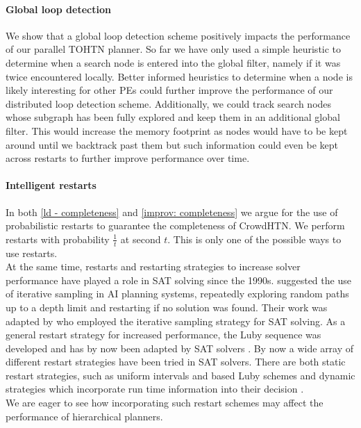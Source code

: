 \paragraph{Global loop detection}
We show that a global loop detection scheme positively impacts the performance of our parallel TOHTN planner. So far we have only used a simple heuristic to determine when a search node is entered into the global filter, namely if it was twice encountered locally.
Better informed heuristics to determine when a node is likely interesting for other PEs could further improve the performance of our distributed loop detection scheme. Additionally, we could track search nodes whose subgraph has been fully explored and keep them in an additional global filter. This would increase the memory footprint as nodes would have to be kept around until we backtrack past them but such information could even be kept across restarts to further improve performance over time.

\paragraph{Intelligent restarts}
In both \ref{ld - completeness} and \ref{improv: completeness} we argue for the use of probabilistic restarts to guarantee the completeness of CrowdHTN. We perform restarts with probability $\frac{1}{t}$ at second $t$. This is only one of the possible ways to use restarts. \\
At the same time, restarts and restarting strategies to increase solver performance have played a role in SAT solving since the 1990s.
\cite{langley1992systematic} suggested the use of iterative sampling in AI planning systems, repeatedly exploring random paths up to a depth limit and restarting if no solution was found. 
Their work was adapted by \cite{crawford1994experimental} who employed the iterative sampling strategy for SAT solving. As a general restart strategy for increased performance, the Luby sequence was developed \cite{luby1993optimal} and has by now been adapted by SAT solvers \cite{huang2007effect}. By now a wide array of different restart strategies have been tried in SAT solvers. There are both static restart strategies, such as uniform intervals and based Luby schemes and dynamic strategies which incorporate run time information into their decision \cite{biere2015evaluating}. \\
We are eager to see how incorporating such restart schemes may affect the performance of hierarchical planners.

